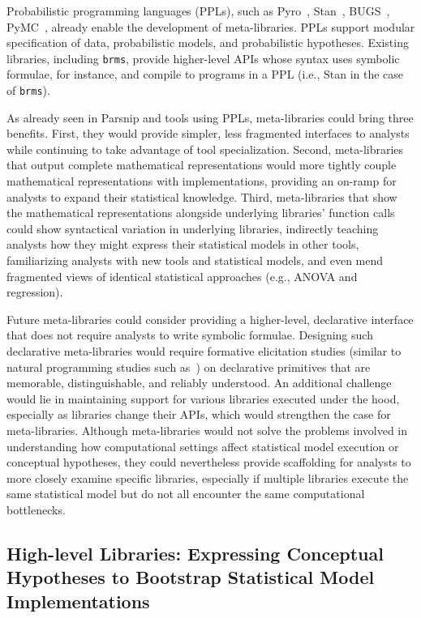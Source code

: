 Probabilistic programming languages (PPLs), such as Pyro~\cite{pyro}, Stan~\cite{stan},
BUGS~\cite{bugs}, PyMC~\cite{pymc3}, already enable the development of
meta-libraries. PPLs support modular specification of data, probabilistic
models, and probabilistic hypotheses. Existing libraries, including
\texttt{brms}, provide higher-level APIs whose syntax uses symbolic formulae,
for instance, and compile to programs in a PPL (i.e., Stan in the case of
\texttt{brms}). 

As already seen in Parsnip and tools using PPLs, meta-libraries could
bring three benefits. First, they would provide simpler, less fragmented
interfaces to analysts while continuing to take advantage of tool
specialization. Second, meta-libraries that output complete mathematical
representations would more tightly couple mathematical representations with
implementations, providing an on-ramp for analysts to expand their statistical
knowledge. Third, meta-libraries that show the mathematical representations
alongside underlying libraries' function calls could show syntactical variation
in underlying libraries, indirectly teaching analysts how they might express
their statistical models in other tools, familiarizing analysts with new tools
and statistical models, and even mend fragmented views of identical statistical approaches (e.g., ANOVA and
regression). 

Future meta-libraries could consider providing a higher-level, declarative
interface that does not require analysts to write symbolic formulae. Designing
such declarative meta-libraries would require formative elicitation studies
(similar to natural programming studies such as~\cite{verou2018extending}) on
declarative primitives that are memorable, distinguishable, and reliably
understood. An additional challenge would lie in maintaining support for various
libraries executed under the hood, especially as libraries change their APIs,
which would strengthen the case for meta-libraries. Although meta-libraries
would not solve the problems involved in understanding how computational
settings affect statistical model execution or conceptual hypotheses, they could
nevertheless provide scaffolding for analysts to more closely examine specific
libraries, especially if multiple libraries execute the same statistical model but do not
all encounter the same computational bottlenecks. 

\subsection*{High-level Libraries: Expressing Conceptual Hypotheses to Bootstrap Statistical Model Implementations}

